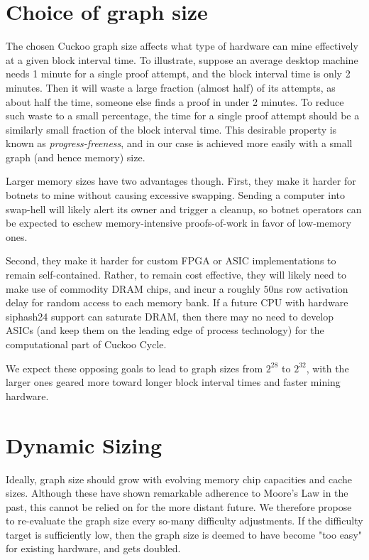\documentclass[11pt, oneside]{article}
\begin{document}
\section{Choice of graph size}
The chosen Cuckoo graph size affects what type of hardware can mine effectively at a given block interval time.
To illustrate, suppose an average desktop machine needs 1 minute for a single proof attempt,
and the block interval time is only 2 minutes. Then it will waste a large fraction (almost half)
of its attempts, as about half the time, someone else finds a proof in under 2 minutes. To reduce such waste
to a small percentage, the time for a single proof attempt should be a similarly small fraction of the block
interval time. This desirable property is known as {\em progress-freeness}, and in our case
is achieved more easily with a small graph (and hence memory) size.

Larger memory sizes have two advantages though. First, they make it harder for botnets to mine without
causing excessive swapping. Sending a computer into swap-hell will likely alert its owner and trigger a cleanup,
so botnet operators can be expected to eschew memory-intensive proofs-of-work in favor of low-memory ones.

Second, they make it harder for custom FPGA or ASIC implementations to remain self-contained.
Rather, to remain cost effective, they will likely need to make use of commodity DRAM chips,
and incur a roughly $50$ns row activation delay for random access to each memory bank.
If a future CPU with hardware siphash24 support can saturate DRAM, then there may no need
to develop ASICs (and keep them on the leading edge of process technology)
for the computational part of Cuckoo Cycle.

We expect these opposing goals to lead to graph sizes from $2^{28}$ to $2^{32}$, with the larger ones geared
more toward longer block interval times and faster mining hardware.

\section{Dynamic Sizing}
Ideally, graph size should grow with evolving memory chip capacities and cache sizes.
Although these have shown remarkable adherence to Moore's Law in the past,
this cannot be relied on for the more distant future. We therefore propose to re-evaluate the graph size
every so-many difficulty adjustments. If the difficulty target is sufficiently low, then the
graph size is deemed to have become "too easy" for existing hardware, and gets doubled.
\end{document}
